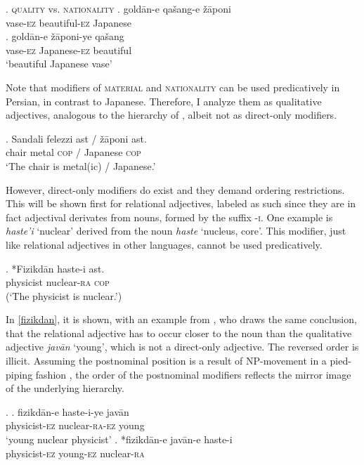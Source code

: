 \ex. \textsc{quality} vs. \textsc{nationality}
\ag. goldān-e qašang-e \v{z}āponi\\
vase-\textsc{ez} beautiful-\textsc{ez} Japanese\\
\bg. goldān-e \v{z}āponi-ye qašang\\
vase-\textsc{ez} Japanese-\textsc{ez} beautiful\\
`beautiful Japanese vase'

Note that modifiers of \textsc{material} and \textsc{nationality} can be used predicatively in Persian, in contrast to Japanese. Therefore, I analyze them as qualitative adjectives, analogous to the hierarchy of \citet{scott:2002:stacked}, albeit not as direct-only modifiers.  %

\exg. Sandali felezzi ast / \v{z}āponi ast.\\
chair metal \textsc{cop} / Japanese \textsc{cop}\\
`The chair is metal(ic) / Japanese.’

However, direct-only modifiers do exist and they demand ordering restrictions. This will be shown first for relational adjectives, labeled as such since they are in fact adjectival derivates from nouns, formed by the suffix -\textsc{i}. One example is \textit{haste’i} `nuclear’ derived from the noun \textit{haste} `nucleus, core’. This modifier, just like relational adjectives in other languages, cannot be used predicatively.  

\exg. *Fizikdān haste-i ast.\\
physicist nuclear-\textsc{ra} \textsc{cop}\\
(`The physicist is nuclear.’)

In \ref{fizikdan}, it is shown, with an example from \citet{kahne:2014:revisiting}, who draws the same conclusion, that the relational adjective has to occur closer to the noun than the qualitative adjective \textit{javān} `young’, which is not a direct-only adjective. The reversed order is illicit. Assuming the postnominal position is a result of NP-movement in a pied-piping fashion \citep{ross:1967:constraints, cinque:2010:adj}, the order of the postnominal modifiers reflects the mirror image of the underlying hierarchy. 

\ex. \label{fizikdan} \ag. fizikdān-e haste-i-ye javān\\
physicist-\textsc{ez} nuclear-\textsc{ra-ez} young\\
`young nuclear physicist'
\bg. *fizikdān-e javān-e haste-i\\
physicist-\textsc{ez} young-\textsc{ez} nuclear-\textsc{ra} \hfill \citep[18]{kahne:2014:revisiting}\\

